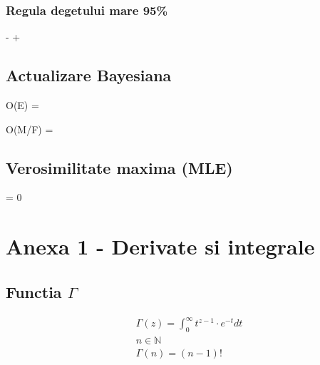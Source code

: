 \documentclass[oneside]{memoir}
\begin{document}
\subsection*{Regula degetului mare 95\%}
\begin{center}
    \begin{myequation*}
 -  \le \mu \le  {} + 
    \end{myequation*}
\end{center}

\section[Actualizare Bayesiana]{Actualizare Bayesiana}
\begin{center}
    \begin{myequation*}
O(E) = 
    \end{myequation*}
\end{center}

\begin{center}
    \begin{myequation*}
O(M/F) = 
    \end{myequation*}
\end{center}

\section[Verosimilitate maxima (MLE)]{Verosimilitate maxima (MLE)}
\begin{center}
    \begin{myequation*}
 = 0
    \end{myequation*}
\end{center}




\chapter[Anexa 1 - Derivate si integrale]{Anexa 1 - Derivate si integrale}
\section[Functia $\Gamma$]{Functia $\Gamma$}
\begin{center}
    \begin{equation*}
        \begin{split}
&\Gamma(z) = \int_{0}^{\infty} t^{z-1}\cdot e^{-t}dt\\
&n\in \mathbb{N}\\
&\Gamma(n) = (n-1)!
        \end{split}
    \end{equation*}
\end{center}
\end{document}
